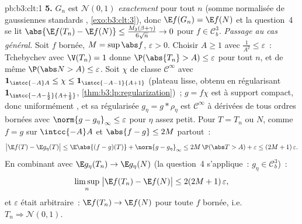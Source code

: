 \begin{solution}{pb:b3:clt:1}
\textbf{5.} $G_n$ est $\mathcal N(0,1)$ \emph{exactement}
pour tout $n$ (somme normalisée de gaussiennes standards
, \cref{exo:b3:clt:3}), donc $\E f(G_n) =
\E f(N)$ et la question~4 se lit $\abs{\E f(T_n) - \E f(N)}
\leq \frac{M_3(\beta+\gamma)}{6\sqrt n} \to 0$ pour $f \in
\mathcal C^3_b$. \emph{Passage au cas général.} Soit $f$
 bornée, $M = \sup\abs f$, $\varepsilon > 0$. Choisir
$A \geq 1$ avec $\frac1{A^2} \leq \varepsilon$~: Tchebychev
avec $\V(T_n) = 1$ donne $\P(\abs{T_n} > A) \leq
\varepsilon$ pour tout $n$, et de même $\P(\abs N > A) \leq
\varepsilon$. Soit $\chi$ de classe $\mathcal C^\infty$ avec
$\mathbf 1_{\intcc{-A}A} \leq \chi \leq
\mathbf 1_{\intcc{-A-1}{A+1}}$ (plateau lisse, obtenu en
régularisant $\mathbf 1_{\intcc{-A-\frac12}{A+\frac12}}$,
\cref{thm:b3:lp:regularization})~; $g = f\chi$ est 
à support compact, donc uniformément , et sa
régularisée $g_\eta = g * \rho_\eta$ est $\mathcal C^\infty$
à dérivées de tous ordres bornées avec $\norm{g -
g_\eta}_\infty \leq \varepsilon$ pour $\eta$ assez petit.
Pour $T = T_n$ ou $N$, comme $f = g$ sur $\intcc{-A}A$ et
$\abs{f - g} \leq 2M$ partout~:
\[
\bigl|\E f(T) - \E g_\eta(T)\bigr| \leq
\E\abs{(f - g)(T)} + \norm{g - g_\eta}_\infty
\leq 2M\,\P(\abs T > A) + \varepsilon \leq
(2M + 1)\,\varepsilon .
\]
En combinant avec $\E g_\eta(T_n) \to \E g_\eta(N)$ (la
question~4 s'applique~: $g_\eta \in \mathcal C^3_b$)~:
\[
\limsup_n\;\bigl|\E f(T_n) - \E f(N)\bigr| \leq
2(2M + 1)\,\varepsilon ,
\]
et $\varepsilon$ était arbitraire~: $\E f(T_n) \to \E f(N)$
pour toute $f$  bornée, i.e.\ $T_n \Rightarrow
\mathcal N(0,1)$.


\end{solution}

